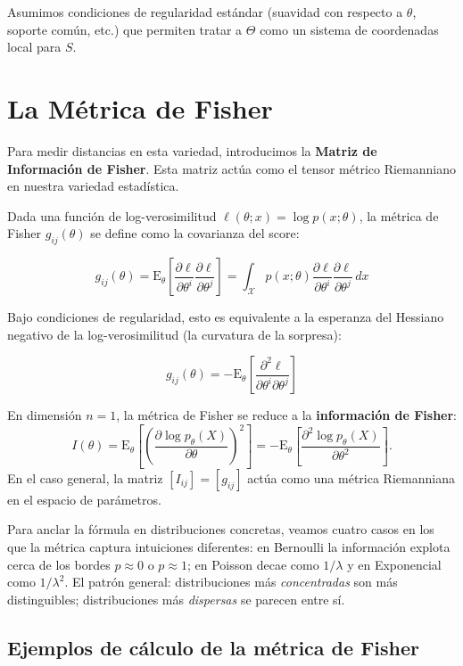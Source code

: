 Asumimos condiciones de regularidad estándar (suavidad con respecto a $\theta$, soporte común, etc.) que permiten tratar a $\Theta$ como un sistema de coordenadas local para $S$.

\section{La Métrica de Fisher}

Para medir distancias en esta variedad, introducimos la \textbf{Matriz de Información de Fisher}. Esta matriz actúa como el tensor métrico Riemanniano en nuestra variedad estadística.

Dada una función de log-verosimilitud $\ell(\theta; x) = \log p(x; \theta)$, la métrica de Fisher $g_{ij}(\theta)$ se define como la covarianza del score:

\[ g_{ij}(\theta) = \mathrm{E}_\theta \left[ \frac{\partial \ell}{\partial \theta^i} \frac{\partial \ell}{\partial \theta^j} \right] = \int_{\mathcal{X}} p(x; \theta) \frac{\partial \ell}{\partial \theta^i} \frac{\partial \ell}{\partial \theta^j} \, dx \]

Bajo condiciones de regularidad, esto es equivalente a la esperanza del Hessiano negativo de la log-verosimilitud (la curvatura de la sorpresa):

\[ g_{ij}(\theta) = -\mathrm{E}_\theta \left[ \frac{\partial^2 \ell}{\partial \theta^i \partial \theta^j} \right] \]

\begin{definition}
	En dimensión $n = 1$, la métrica de Fisher se reduce a la \textbf{información de Fisher}:
	\[
	I(\theta) = \mathrm{E}_\theta\!\left[\left(\frac{\partial \log p_\theta(X)}{\partial \theta}\right)^2\right] = -\mathrm{E}_\theta\!\left[\frac{\partial^2 \log p_\theta(X)}{\partial \theta^2}\right].
	\]
	En el caso general, la matriz $[I_{ij}] = [g_{ij}]$ actúa como una métrica Riemanniana en el espacio de parámetros.
\end{definition}

Para anclar la fórmula en distribuciones concretas, veamos cuatro casos en los que la métrica captura intuiciones diferentes: en Bernoulli la información explota cerca de los bordes $p\approx 0$ o $p\approx 1$; en Poisson decae como $1/\lambda$ y en Exponencial como $1/\lambda^2$. El patrón general: distribuciones más \emph{concentradas} son más distinguibles; distribuciones más \emph{dispersas} se parecen entre sí.

\subsection{Ejemplos de cálculo de la métrica de Fisher}

